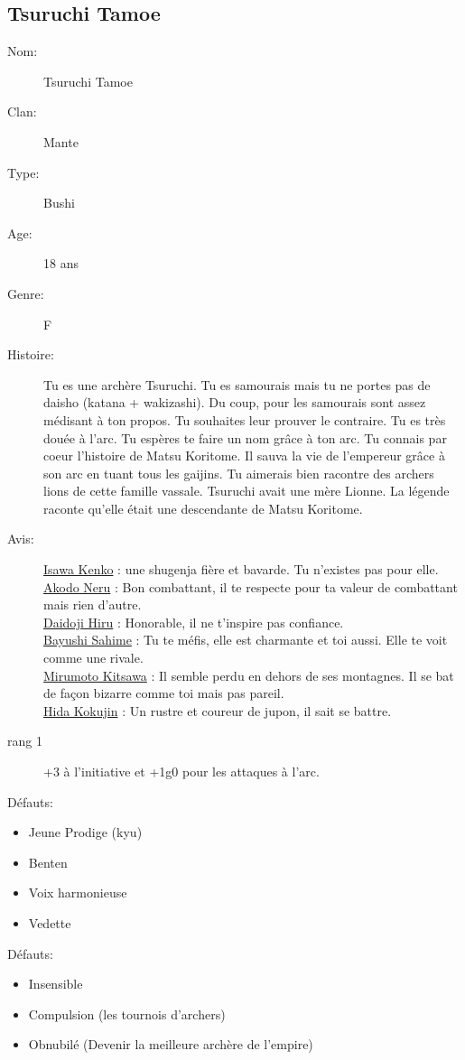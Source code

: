 \documentclass[oneside,12pt]{book}
\begin{document}
\begin{flushleft}
\clearpage

\section{Tsuruchi Tamoe}
\begin{description}
\item[Nom:]{Tsuruchi Tamoe}
\item[Clan:]{Mante}
\item[Type:]{Bushi}
\item[Age:]{18 ans}
\item[Genre:]{F} 
\item[Histoire:]{
Tu es une archère Tsuruchi. Tu es samourais mais tu ne portes pas de daisho (katana + wakizashi). Du coup, pour les samourais sont assez médisant à ton propos.
Tu souhaites leur prouver le contraire. Tu es très douée à l'arc. Tu espères te faire un nom grâce à ton arc. Tu connais par coeur l'histoire de Matsu Koritome. Il sauva la vie de l'empereur grâce à son arc en tuant tous les gaijins. Tu aimerais bien racontre des archers lions de cette famille vassale. Tsuruchi avait une mère Lionne. La légende raconte qu'elle était une descendante de Matsu Koritome.
\vspace{0.2cm}
}
\item[Avis:]{
\underline{Isawa Kenko} : une shugenja fière et bavarde. Tu n'existes pas pour elle.\\
\underline{Akodo Neru} : Bon combattant, il te respecte pour ta valeur de combattant mais rien d'autre.\\
\underline{Daidoji Hiru} : Honorable, il ne t'inspire pas confiance.\\
\underline{Bayushi Sahime} : Tu te méfis, elle est charmante et toi aussi. Elle te voit comme une rivale.\\
\underline{Mirumoto Kitsawa} : Il semble perdu en dehors de ses montagnes. Il se bat de façon bizarre comme toi mais pas pareil. \\
\underline{Hida Kokujin} : Un rustre et coureur de jupon, il sait se battre. \\
}
\item[rang 1]{
+3 à l'initiative et +1g0 pour les attaques à l'arc. 
}
\end{description}
\vspace{0.2cm}
Défauts:
\begin{itemize}
\item Jeune Prodige (kyu)
\item Benten
\item Voix harmonieuse
\item Vedette
\end{itemize}
Défauts:
\begin{itemize}
\item Insensible
\item Compulsion (les tournois d'archers)
\item Obnubilé (Devenir la meilleure archère de l'empire)
\end{itemize}


\end{flushleft}
\end{document}
